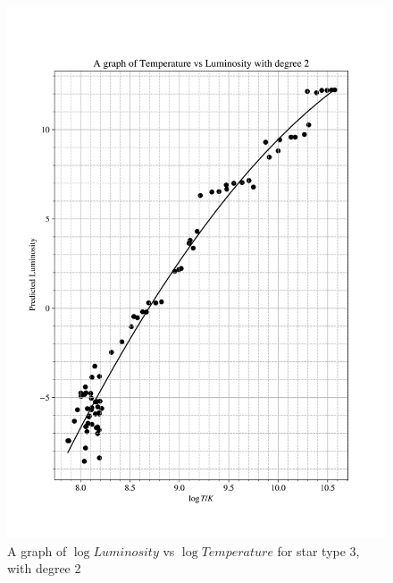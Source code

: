 \documentclass[12pt, a4paper]{article}
\begin{document}
\begin{figure}[H]
    \centering
    \includegraphics[width = \textwidth]{2Plot4_2.png}
    \caption{A graph of \(\log{Luminosity}\) vs \(\log{Temperature}\) for star type 3, with degree 2}
\end{figure}
\end{document}

